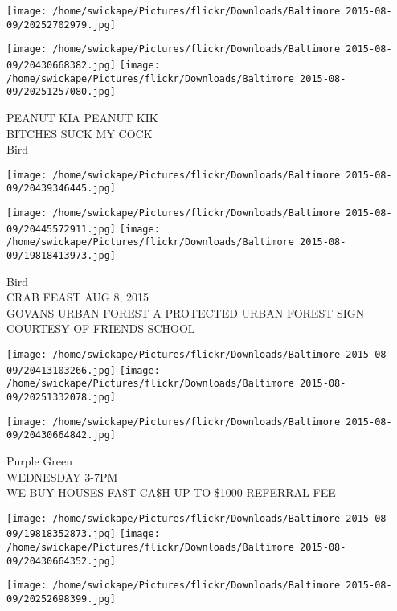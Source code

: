 \documentclass[10pt,letterpaper]{article}
\begin{document}
\texttt{[image: /home/swickape/Pictures/flickr/Downloads/Baltimore 2015-08-09/20252702979.jpg]}

\vspace{0.25in}
\texttt{[image: /home/swickape/Pictures/flickr/Downloads/Baltimore 2015-08-09/20430668382.jpg]}
\texttt{[image: /home/swickape/Pictures/flickr/Downloads/Baltimore 2015-08-09/20251257080.jpg]}

PEANUT KIA PEANUT KIK\\
BITCHES SUCK MY COCK\\
Bird\\
\pagebreak

\texttt{[image: /home/swickape/Pictures/flickr/Downloads/Baltimore 2015-08-09/20439346445.jpg]}

\vspace{0.25in}
\texttt{[image: /home/swickape/Pictures/flickr/Downloads/Baltimore 2015-08-09/20445572911.jpg]}
\texttt{[image: /home/swickape/Pictures/flickr/Downloads/Baltimore 2015-08-09/19818413973.jpg]}

Bird\\
CRAB FEAST AUG 8, 2015\\
GOVANS URBAN FOREST A PROTECTED URBAN FOREST SIGN COURTESY OF FRIENDS SCHOOL\\
\pagebreak

\texttt{[image: /home/swickape/Pictures/flickr/Downloads/Baltimore 2015-08-09/20413103266.jpg]}
\texttt{[image: /home/swickape/Pictures/flickr/Downloads/Baltimore 2015-08-09/20251332078.jpg]}

\vspace{0.25in}
\texttt{[image: /home/swickape/Pictures/flickr/Downloads/Baltimore 2015-08-09/20430664842.jpg]}

Purple Green\\
WEDNESDAY 3{-}7PM\\
WE BUY HOUSES FA\$T CA\$H UP TO \$1000 REFERRAL FEE\\
\pagebreak

\texttt{[image: /home/swickape/Pictures/flickr/Downloads/Baltimore 2015-08-09/19818352873.jpg]}
\texttt{[image: /home/swickape/Pictures/flickr/Downloads/Baltimore 2015-08-09/20430664352.jpg]}

\vspace{0.25in}
\texttt{[image: /home/swickape/Pictures/flickr/Downloads/Baltimore 2015-08-09/20252698399.jpg]}
\end{document}
